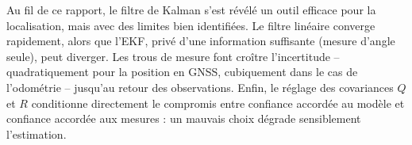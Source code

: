 \documentclass[11pt]{article}
\theoremstyle{remark}
\theoremstyle{definition}
\begin{document}
Au fil de ce rapport, le filtre de Kalman s'est révélé un outil efficace pour la localisation,
mais avec des limites bien identifiées. Le filtre linéaire converge rapidement, alors que l'EKF,
privé d'une information suffisante (mesure d'angle seule), peut diverger. Les trous de mesure
font croître l'incertitude -- quadratiquement pour la position en GNSS, cubiquement dans le cas
de l'odométrie -- jusqu'au retour des observations. Enfin, le réglage des covariances $Q$ et $R$
conditionne directement le compromis entre confiance accordée au modèle et confiance accordée aux
mesures : un mauvais choix dégrade sensiblement l'estimation.
\end{document}
